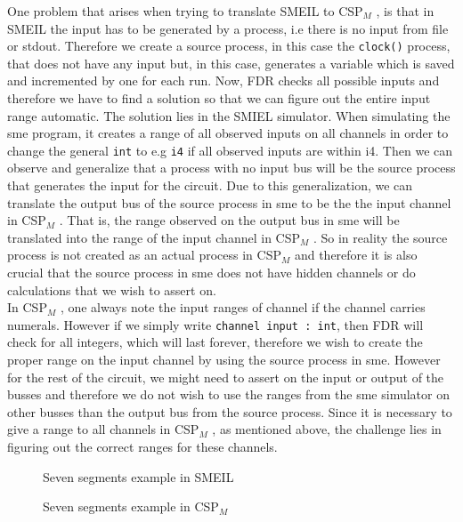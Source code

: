 \documentclass[a4paper]{report}
\newcommand{\cspm}{CSP$_M$ }
\begin{document}
One problem that arises when trying to translate SMEIL to \cspm, is that in SMEIL the input has to be generated by a process, i.e there is no input from file or stdout. 
Therefore we create a source process, in this case the \texttt{clock()} process, that does not have any input but, in this case, generates a variable which is saved and incremented by one for each run.
Now, FDR checks all possible inputs and therefore we have to find a solution so that we can figure out the entire input range automatic. 
The solution lies in the SMIEL simulator. 
When simulating the sme program, it creates a range of all observed inputs on all channels in order to change the general \texttt{int} to e.g \texttt{i4} if all observed inputs are within i4. 
Then we can observe and generalize that a process with no input bus will be the source process that generates the input for the circuit.
Due to this generalization, we can translate the output bus of the source process in sme to be the the input channel in \cspm. 
That is, the range observed on the output bus in sme will be translated into the range of the input channel in \cspm. 
So in reality the source process is not created as an actual process in \cspm and therefore it is also crucial that the source process in sme does not have hidden channels or do calculations that we wish to assert on. \\ 
In \cspm, one always note the input ranges of channel if the channel carries numerals. However if we simply write \texttt{channel input : int}, then FDR will check for all integers, which will last forever, therefore we wish to create the proper range on the input channel by using the source process in sme. 
However for the rest of the circuit, we might need to assert on the input or output of the busses and therefore we do not wish to use the ranges from the sme simulator on other busses than the output bus from the source process.
Since it is necessary to give a range to all channels in \cspm, as mentioned above, the challenge lies in figuring out the correct ranges for these channels. \\

\begin{figure}
\label{seven_segments_exaple.sme}
\caption{Seven segments example in SMEIL}
\end{figure}


\begin{figure}
\label{seven_segments_exaple.csp}
\caption{Seven segments example in \cspm}
\end{figure}
\end{document}
